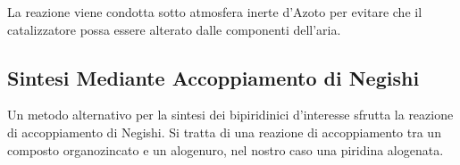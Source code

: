 \documentclass[a4paper, 12pt]{article}
\begin{document}
La reazione viene condotta sotto atmosfera inerte d'Azoto per evitare che il catalizzatore possa essere alterato dalle componenti dell'aria.

\subsection{Sintesi Mediante Accoppiamento di Negishi}
Un metodo alternativo per la sintesi dei  bipiridinici d'interesse sfrutta la reazione di accoppiamento di Negishi. Si tratta di una reazione di accoppiamento tra un composto organozincato e un alogenuro, nel nostro caso una piridina alogenata. \cite{clayden_organic_2012}
\end{document}
